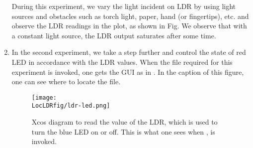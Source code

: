 \begin{enumerate}
  During this experiment, we vary the light incident on LDR by using
   light sources and obstacles such as torch light, paper,
  hand (or fingertips), etc. and observe the LDR readings in the plot, as shown in 
  Fig. We observe that with a constant light source, the LDR output saturates after some time. 


\item In the second experiment, we take a step further and control the
state of red LED in accordance with the LDR values. When the file required for this
  experiment is invoked, one gets the GUI as in .
  In the caption of this figure, one can see where to locate the file.

  \begin{figure}
    \centering
    \texttt{[image: \\LocLDRfig/ldr-led.png]}
    \caption[Xcos diagram to read the value of the LDR, which is used
    to turn the blue LED on or off] {Xcos diagram to read the value of
      the LDR, which is used to turn the blue LED on or off.  This is
      what one sees when , is
      invoked.}
    \label{fig:ldr-led}
  \end{figure}


\end{enumerate}
